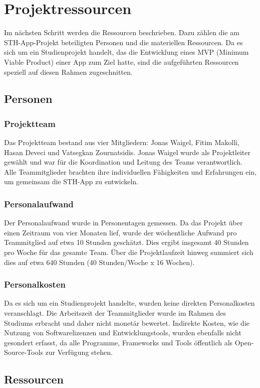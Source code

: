\chapter{Projektressourcen}
Im nächsten Schritt werden die Ressourcen beschrieben. Dazu zählen die am STH-App-Projekt beteiligten Personen und die materiellen Ressourcen.
Da es sich um ein Studienprojekt handelt, das die Entwicklung eines MVP (Minimum Viable Product) einer App zum Ziel hatte, sind die aufgeführten Ressourcen speziell auf diesen Rahmen zugeschnitten.

\section{Personen}
\subsection{Projektteam}
Das Projektteam bestand aus vier Mitgliedern: Jonas Waigel, Fitim Makolli, Hasan Deveci und Vatsegkan Zournatsidis.
Jonas Waigel wurde als Projektleiter gewählt und war für die Koordination und Leitung des Teams verantwortlich.
Alle Teammitglieder brachten ihre individuellen Fähigkeiten und Erfahrungen ein, um gemeinsam die STH-App zu entwickeln.

\subsection{Personalaufwand}
Der Personalaufwand wurde in Personentagen gemessen.
Da das Projekt über einen Zeitraum von vier Monaten lief, wurde der wöchentliche Aufwand pro Teammitglied auf etwa 10 Stunden geschätzt.
Dies ergibt insgesamt 40 Stunden pro Woche für das gesamte Team.
Über die Projektlaufzeit hinweg summiert sich dies auf etwa 640 Stunden (40 Stunden/Woche x 16 Wochen).

\subsection{Personalkosten}
Da es sich um ein Studienprojekt handelte, wurden keine direkten Personalkosten veranschlagt.
Die Arbeitszeit der Teammitglieder wurde im Rahmen des Studiums erbracht und daher nicht monetär bewertet.
Indirekte Kosten, wie die Nutzung von Softwarelizenzen und Entwicklungstools, wurden ebenfalls nicht gesondert erfasst, da alle Programme, Frameworks und Tools öffentlich als Open-Source-Tools zur Verfügung stehen.

\section{Ressourcen}
